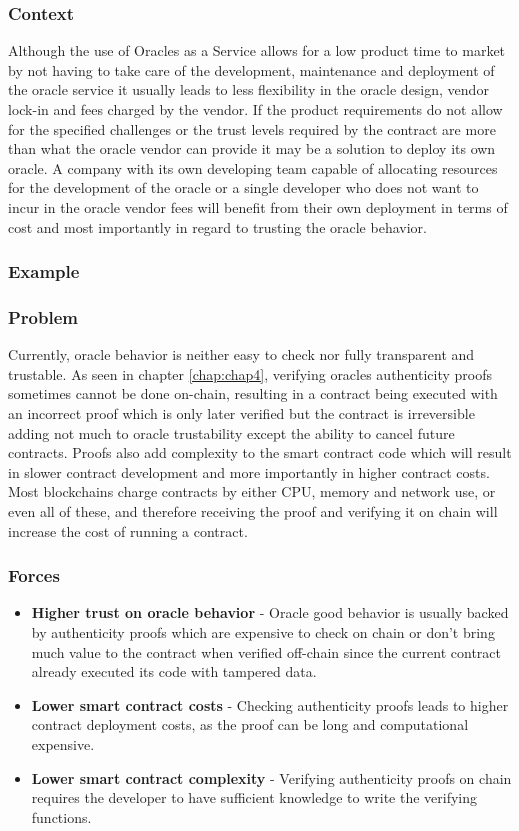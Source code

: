 \subsubsection{Context}
Although the use of Oracles as a Service allows for a low product time to market by not having to take care of the development, maintenance and deployment of the oracle service it usually leads to less flexibility in the oracle design, vendor lock-in and fees charged by the vendor. If the product requirements do not allow for the specified challenges or the trust levels required by the contract are more than what the oracle vendor can provide it may be a solution to deploy its own oracle. A company with its own developing team capable of allocating resources for the development of the oracle or a single developer who does not want to incur in the oracle vendor fees will benefit from their own deployment in terms of cost and most importantly in regard to trusting the oracle behavior.

\subsubsection{Example}


\subsubsection{Problem}
Currently, oracle behavior is neither easy to check nor fully transparent and trustable. As seen in chapter \ref{chap:chap4}, verifying oracles authenticity proofs sometimes cannot be done on-chain, resulting in a contract being executed with an incorrect proof which is only later verified but the contract is irreversible adding not much to oracle trustability except the ability to cancel future contracts. Proofs also add complexity to the smart contract code which will result in slower contract development and more importantly in higher contract costs. Most blockchains charge contracts by either CPU, memory and network use, or even all of these, and therefore receiving the proof and verifying it on chain will increase the cost of running a contract. 

\subsubsection{Forces}
\begin{itemize}
  \item \textbf{Higher trust on oracle behavior} - Oracle good behavior is usually backed by authenticity proofs which are expensive to check on chain or don't bring much value to the contract when verified off-chain since the current contract already executed its code with tampered data.
  \item \textbf{Lower smart contract costs} - Checking authenticity proofs leads to higher contract deployment costs, as the proof can be long and computational expensive.
  \item \textbf{Lower smart contract complexity} - Verifying authenticity proofs on chain requires the developer to have sufficient knowledge to write the verifying functions. 
\end{itemize}

